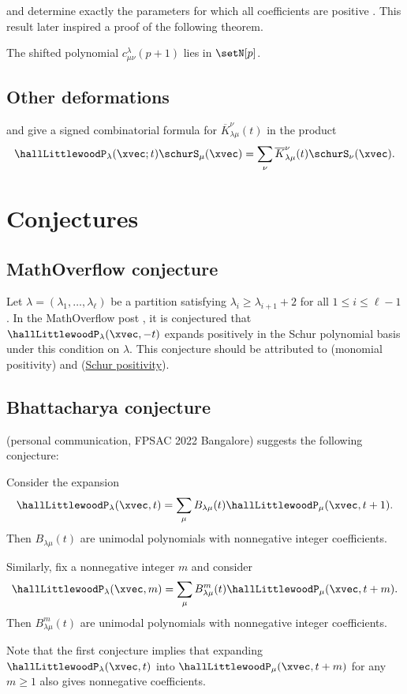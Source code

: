  and  determine exactly the
parameters for which all coefficients are positive \cite{ButlerHales1993}.
This result later inspired a proof of the following theorem.
\begin{theorem}
The shifted polynomial $c^{\lambda}_{\mu\nu}(p+1)$ lies in $\setN[p]$.
\end{theorem}


\subsection[hallLittlewoodOtherCoeffs]{Other deformations}

 and  give a signed
combinatorial formula for $\overline{K}^{\nu}_{\lambda\mu}(t)$ in the product
\cite[Thm.~4]{WheelerZinnJustin2018}
\[
\hallLittlewoodP_\lambda(\xvec;t) \schurS_\mu(\xvec)
= \sum_{\nu} \overline{K}^{\nu}_{\lambda\mu}(t) \schurS_\nu(\xvec).
\]


\section[hallLittlewoodConjectures]{Conjectures}


\subsection[hallLittlewoodNegativeT]{MathOverflow conjecture}

Let $\lambda = (\lambda_1,\dotsc,\lambda_\ell)$
be a partition satisfying $\lambda_i \geq \lambda_{i+1}+2$ for all
$1 \leq i \leq \ell-1$.
In the MathOverflow post \cite{MO190646}, it is conjectured that
$\hallLittlewoodP_\lambda(\xvec,-t)$
expands positively in the Schur polynomial basis under this condition on $\lambda$.
This conjecture should be attributed to  (monomial
positivity) and 
(\hyperref[schurPositiveDefinition]{Schur positivity}).


\subsection[hallLittlewoodBhattacharya]{Bhattacharya conjecture}

 (personal communication, FPSAC 2022 Bangalore)
suggests the following conjecture:
\begin{conjecture}
Consider the expansion
\[
\hallLittlewoodP_\lambda(\xvec,t) = \sum_\mu B_{\lambda\mu}(t) \hallLittlewoodP_\mu(\xvec,t+1).
\]
Then $B_{\lambda\mu}(t)$ are unimodal polynomials with nonnegative integer
coefficients.

Similarly, fix a nonnegative integer $m$ and consider
\[
\hallLittlewoodP_\lambda(\xvec,m) = \sum_\mu B^m_{\lambda\mu}(t) \hallLittlewoodP_\mu(\xvec,t+m).
\]
Then $B^m_{\lambda\mu}(t)$ are unimodal polynomials with nonnegative integer
coefficients.
\end{conjecture}
Note that the first conjecture implies that expanding
$\hallLittlewoodP_\lambda(\xvec,t)$ into
$\hallLittlewoodP_\mu(\xvec,t+m)$ for any $m \geq 1$ also gives nonnegative
coefficients.

